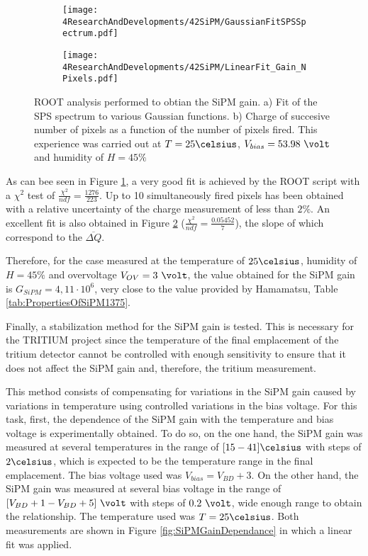 \begin{figure}
\centering
    \begin{subfigure}[b]{0.47\textwidth}
    \centering
    \texttt{[image: 4ResearchAndDevelopments/42SiPM/GaussianFitSPSSpectrum.pdf]}  
    \caption{\label{subfig:GaussianFitSiPMs}}
    \end{subfigure}
    \hfill
    \begin{subfigure}[b]{0.47\textwidth}
    \centering
    \texttt{[image: 4ResearchAndDevelopments/42SiPM/LinearFit\_Gain\_NPixels.pdf]}  
    \caption{\label{subfig:LinearFitSiPMGain}}
    \end{subfigure}
 \caption{ROOT analysis performed to obtian the SiPM gain. a) Fit of the SPS spectrum to various Gaussian functions. b) Charge of succesive number of pixels as a function of the number of pixels fired. This experience was carried out at $T=25\celsius$, $V_{bias}=53.98~\volt$ and humidity of $H=45\%$}
 \label{fig:ROOTAnalysisSiPMGain}
\end{figure}

As can bee seen in Figure \ref{subfig:GaussianFitSiPMs}, a very good fit is achieved by the ROOT script with a $\chi^2$ test of $\frac{\chi^2}{ndf}=\frac{1276}{223}$. Up to 10 simultaneously fired pixels has been obtained with a relative uncertainty of the charge measurement of less than $2\%$. An excellent fit is also obtained in Figure \ref{subfig:LinearFitSiPMGain} ($\frac{\chi^2}{ndf}=\frac{0.05452}{7}$), the slope of which correspond to the $\overline{\Delta Q}$.

Therefore, for the case measured at the temperature of $25\celsius$, humidity of $H=45\%$ and overvoltage $V_{OV}=3~\volt$, the value obtained for the SiPM gain is $G_{SiPM}=4,11\cdot{} 10^{6}$, very close to the value provided by Hamamatsu, Table \ref{tab:PropertiesOfSiPM1375}.

Finally, a stabilization method for the SiPM gain is tested. This is necessary for the TRITIUM project since the temperature of the final emplacement of the tritium detector cannot be controlled with enough sensitivity to ensure that it does not affect the SiPM gain and, therefore, the tritium measurement. 

This method consists of compensating for variations in the SiPM gain caused by variations in temperature using controlled variations in the bias voltage. For this task, first, the dependence of the SiPM gain with the temperature and bias voltage is experimentally obtained. To do so, on the one hand, the SiPM gain was measured at several temperatures in the range of $[15-41]\celsius$ with steps of $2\celsius$, which is expected to be the temperature range in the final emplacement. The bias voltage used was $V_{bias} = V_{BD}+3$. On the other hand, the SiPM gain was measured at several bias voltage in the range of $[V_{BD}+1-V_{BD}+5]~\volt$ with steps of $0.2~\volt$, wide enough range to obtain the relationship. The temperature used was $T=25\celsius$. Both measurements are shown in Figure \ref{fig:SiPMGainDependance} in which a linear fit was applied. 

